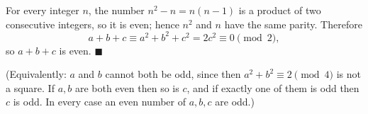 For every integer $n$, the number $n^2-n=n(n-1)$ is a product of two consecutive integers, so it is even; hence $n^2$ and $n$ have the same parity. Therefore
\[
a+b+c\equiv a^2+b^2+c^2=2c^2\equiv0\pmod 2,
\]
so $a+b+c$ is even. $\blacksquare$

(Equivalently: $a$ and $b$ cannot both be odd, since then $a^2+b^2\equiv2\pmod4$ is not a square. If $a,b$ are both even then so is $c$, and if exactly one of them is odd then $c$ is odd. In every case an even number of $a,b,c$ are odd.)
